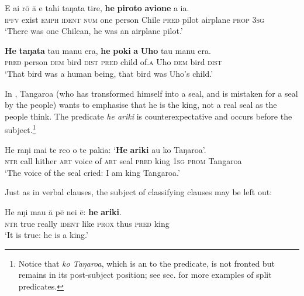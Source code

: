 \ea\label{ex:9.4}
\gll E ai rō {\ꞌ}ā e tahi taŋata tire, \textbf{he} \textbf{piroto} \textbf{{\ꞌ}avione} a ia. \\
\textsc{ipfv} exist \textsc{emph} \textsc{ident} \textsc{num} one person Chile \textsc{pred} pilot airplane \textsc{prop} \textsc{3sg} \\

\glt 
‘There was one Chilean, he was an airplane pilot.’ \textstyleExampleref{[R378.013]} 
\z

\ea\label{ex:9.5}
\gll \textbf{He} \textbf{taŋata} tau manu era, \textbf{he} \textbf{poki} \textbf{{\ꞌ}a} \textbf{Uho} tau manu era. \\
\textsc{pred} person \textsc{dem} bird \textsc{dist} \textsc{pred} child of\textsc{.a} Uho \textsc{dem} bird \textsc{dist} \\

\glt
‘That bird was a human being, that bird was Uho’s child.’ \textstyleExampleref{[Mtx-7-12.069]}
\z

In , Tangaroa (who has transformed himself into a seal, and is mistaken for a seal by the people) wants to emphasise that he is the king, not a real seal as the people think. The predicate \textit{he {\ꞌ}ariki} is counterexpectative and occurs before the subject.\footnote{\label{fn:460}Notice that \textit{ko Taŋaroa}, which is an  to the predicate, is not fronted but remains in its post-subject position; see sec.  for more examples of split predicates.} 

\ea\label{ex:9.6}
\gll He raŋi mai te re{\ꞌ}o o te pakia: ‘\textbf{He} \textbf{{\ꞌ}ariki} au ko Taŋaroa’. \\
\textsc{ntr} call hither \textsc{art} voice of \textsc{art} seal \textsc{pred} king \textsc{1sg} \textsc{prom} Tangaroa \\

\glt 
‘The voice of the seal cried: I am king Tangaroa.’ \textstyleExampleref{[Mtx-1-05.008]}
\z

Just as in verbal clauses, the subject of classifying clauses may be left out:

\ea\label{ex:9.7}
\gll He aŋi mau {\ꞌ}ā pē nei ē: \textbf{he} \textbf{{\ꞌ}ariki}. \\
\textsc{ntr} true really \textsc{ident} like \textsc{prox} thus \textsc{pred} king \\

\glt 
‘It is true: he is a king.’ \textstyleExampleref{[Fel-46.053]}
\z

